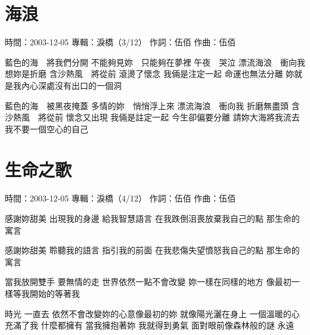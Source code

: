 \documentclass[UTF8,a4paper,oneside,twocolumn,12pt]{ctexbook}
\newcommand{\infopair}[2]{\textbullet #1：#2}
\newcommand{\zc}[1][伍佰]{\infopair{作詞}{#1}}
\newcommand{\zq}[1][伍佰]{\infopair{作曲}{#1}}
\newcommand{\zj}[1]{\infopair{專輯}{#1}}
\newcommand{\sj}[1]{\infopair{時間}{#1}}
\newenvironment{info}{\begin{flushleft}\kaishu
	}
	{\end{flushleft}\normalsize\yahei\par}
\newenvironment{lyric}{
	}
{}
\begin{document}
\section{海浪}
\begin{info}
	\sj{2003-12-05}
	\zj{淚橋（3/12）}
	\zc
	\zq
\end{info}
\begin{lyric}
	藍色的海　將我們分開
	不能夠見妳　只能夠在夢裡
	午夜　哭泣
	漂流海浪　衝向我
	想妳是折磨
	含沙熱風　將從前
	滾燙了懷念
	我倆是注定一起
	命運也無法分離
	妳就是我內心深處沒有出口的一個洞

	藍色的海　被黑夜掩蓋
	多情的妳　悄悄浮上來
	漂流海浪　衝向我
	折磨無盡頭
	含沙熱風　將從前
	懷念又出現
	我倆是註定一起
	今生卻偏要分離
	請妳大海將我流去
	我不要一個空心的自己
\end{lyric}

\section{生命之歌}
\begin{info}
	\sj{2003-12-05}
	\zj{淚橋（4/12）}
	\zc
	\zq
\end{info}
\begin{lyric}
	感謝妳甜美 出現我的身邊 給我智慧語言
	在我跌倒沮喪放棄我自己的點 那生命的寓言

	感謝妳甜美 聆聽我的語言 指引我的前面
	在我悲傷失望憤怒我自己的點 那生命的寓言

	當我放開雙手 要無情的走 世界依然一點不會改變
	妳一樣在同樣的地方 像最初一樣等我開始的等著我

	時光 一直去 依然不會改變妳的心意像最初的妳
	就像陽光灑在身上 一個溫暖的心充滿了我 什麼都擁有
	當我擁抱著妳 我就得到勇氣 面對眼前像森林般的謎 永遠
\end{lyric}
\end{document}
